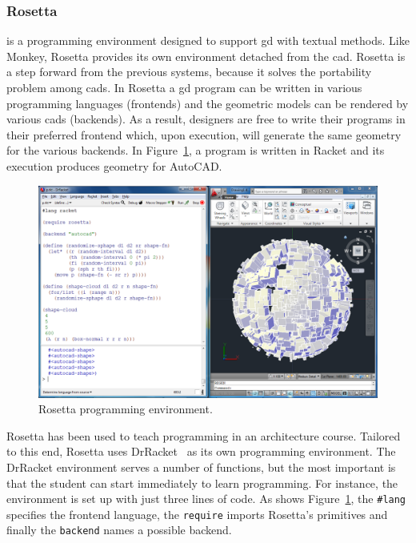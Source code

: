 \subsubsection{Rosetta~\cite{lopes2011portable}} is a programming environment designed to support \ac{gd} with textual methods. Like Monkey, Rosetta provides its own environment detached from the \ac{cad}. Rosetta is a step forward from the previous systems, because it solves the portability problem among \ac{cad}s. In Rosetta a \ac{gd} program can be written in various programming languages (frontends) and the geometric models can be rendered by various \ac{cad}s (backends). As a result, designers are free to write their programs in their preferred frontend which, upon execution, will generate the same geometry for the various backends. In Figure~\ref{fig:rosetta}, a program is written in Racket and its execution produces geometry for AutoCAD.

\begin{figure}[!htbp]
\vspace{-5pt}
  \centering
  \includegraphics[width=1.0\textwidth]{img/rosetta1}
  \vspace{-20pt}
    \caption{Rosetta programming environment.}  
  \label{fig:rosetta}
  \vspace{-10pt}
\end{figure} 

Rosetta has been used to teach programming in an architecture course. Tailored to this end, Rosetta uses DrRacket~\cite{findler2002drscheme} as its own programming environment. The DrRacket environment serves a number of functions, but the most important is that the student can start immediately to learn programming. For instance, the environment is set up with just three lines of code. As shows Figure~\ref{fig:rosetta}, the \texttt{\#lang} specifies the frontend language, the \texttt{require} imports Rosetta's primitives and finally the \texttt{backend} names a possible backend.


